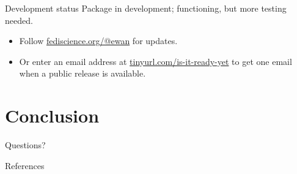 \documentclass[11pt]{beamer}
\begin{document}
\begin{frame}[t]{Development status}
	Package in development; functioning, but more testing needed.

	\begin{itemize}
		\item Follow
		      \href{https://fediscience.org/@ewan}{\textcolor{KCLseablue}{fediscience.org/@ewan}}
		      for updates.
		\item Or enter an email address at
		      \href{https://tinyurl.com/pmsims-announce}{\textcolor{KCLseablue}{tinyurl.com/is-it-ready-yet}}
		      to get one email when a public release is available.
	\end{itemize}

\end{frame}




\section{Conclusion}

\begin{frame}
  Questions?
\end{frame}

\appendix

\begin{frame}[allowframebreaks]{References}
    \printbibliography
\end{frame}
\end{document}
